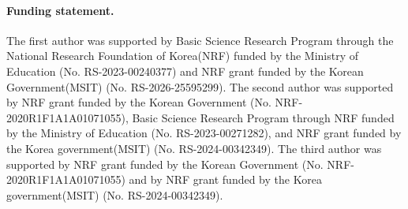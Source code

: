 \documentclass[12pt, reqno]{amsart}
\theoremstyle{plain}
\theoremstyle{definition}
\numberwithin{equation}{section}
\numberwithin{figure}{section}
\numberwithin{table}{section}
\begin{document}
\paragraph{{\bf Funding statement.}}
The first author was supported by 
Basic Science Research Program through the National Research Foundation of Korea(NRF) funded by the Ministry of Education (No. RS-2023-00240377) and
NRF grant funded by the Korean Government(MSIT) (No. RS-2026-25595299).
The second author was supported by NRF grant funded by the Korean Government (No. NRF-2020R1F1A1A01071055), Basic Science Research Program through NRF funded by the Ministry of Education (No. RS-2023-00271282), and NRF grant funded by the Korea government(MSIT) (No. RS-2024-00342349).
The third author was supported by NRF grant funded by the Korean Government (No. NRF-2020R1F1A1A01071055) and by NRF grant funded by the Korea government(MSIT) (No. RS-2024-00342349).






\end{document}
